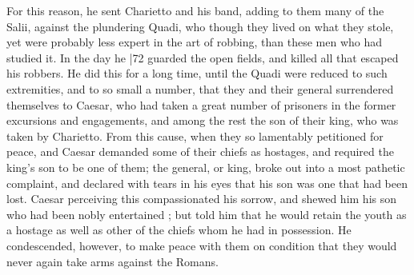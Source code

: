 For this reason, he sent Charietto and his band, adding to them many of the Salii, against the plundering Quadi, who though they lived on what they stole, yet were probably less expert in the art of robbing, than these men who had studied it. In the day he
|72 guarded the open fields, and killed all that escaped his robbers. He did this for a long time, until the Quadi were reduced to such extremities, and to so small a number, that they and their general surrendered themselves to Caesar, who had taken a great number of prisoners in the former excursions and engagements, and among the rest the son of their king, who was taken by Charietto. From this cause, when they so lamentably petitioned for peace, and Caesar demanded some of their chiefs as hostages, and required the king's son to be one of them; the general, or king, broke out into a most pathetic complaint, and declared with tears in his eyes that his son was one that had been lost. Caesar perceiving this compassionated his sorrow, and shewed him his son who had been nobly entertained ; but told him that he would retain the youth as a hostage as well as other of the chiefs whom he had in possession. He condescended, however, to make peace with them on condition that they would never again take arms against the Romans.

